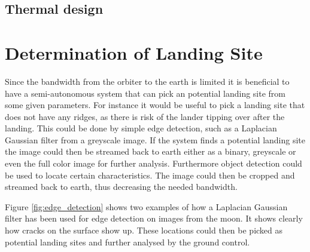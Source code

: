 \subsection{Thermal design}

\section{Determination of Landing Site}


Since the bandwidth from the orbiter to the earth is limited it is beneficial to have a semi-autonomous system that can pick an potential landing site from some given parameters. For instance it would be useful to pick a landing site that does not have any ridges, as there is risk of the lander tipping over after the landing. This could be done by simple edge detection, such as a Laplacian Gaussian filter from a greyscale image. If the system finds a potential landing site the image could then be streamed back to earth either as a binary, greyscale or even the full color image for further analysis. Furthermore object detection could be used to locate certain characteristics. The image could then be cropped and streamed back to earth, thus decreasing the needed bandwidth.

Figure \ref{fig:edge_detection} shows two examples of how a Laplacian Gaussian filter has been used for edge detection on images from the moon. It shows clearly how cracks on the surface show up. These locations could then be picked as potential landing sites and further analysed by the ground control.

